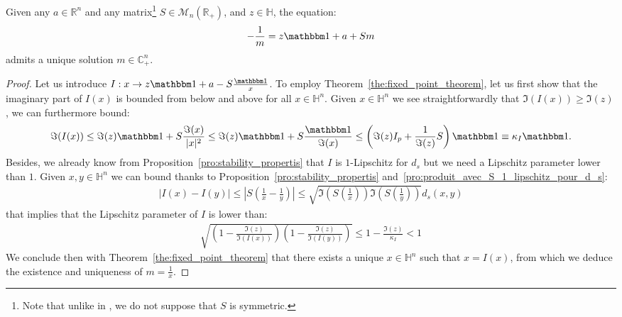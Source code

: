 \documentclass[a4papaer, titlepage]{book}
\begin{document}
\begin{proposition}\label{pro:resolution_equation_erdos}
  Given any $a \in \mathbb R^n$ and any matrix\footnote{Note that unlike in \cite{AJA16}, we do not suppose that $S$ is symmetric.} $S \in \mathcal M_{n}(\mathbb R_+)$, and $z \in \mathbb H$, the equation:
  \begin{align*}
    -\frac{1}{m} = z\un + a + Sm
  \end{align*}
  admits a unique solution $m \in \mathbb C_ +^n$.
\end{proposition}
\begin{proof}
  Let us introduce $I : x \to z\un + a - S \frac{\un}{x}$. To employ Theorem~\ref{the:fixed_point_theorem}, let us first show that the imaginary part of $I(x)$ is bounded from below and above for all $x \in \mathbb H^n$. Given $x \in \mathbb H^n$ we see straightforwardly that $\Im(I(x)) \geq \Im(z)$, we can furthermore bound:
  \begin{align*}
    \Im(I(x)) \leq \Im(z) \un + S \frac{\Im(x)}{|x|^2} \leq \Im(z) \un + S \frac{\un}{\Im(x)}  \leq \left(\Im(z)I_p + \frac{1}{\Im(z)}S\right)\un\equiv \kappa_I \un.
  \end{align*}
  Besides, we already know from Proposition~\ref{pro:stability_propertis} that $I$ is $1$-Lipschitz for $d_s$ but we need a Lipschitz parameter lower than $1$.
  Given $x,y \in \mathbb H^n$ we can bound thanks to Proposition~\ref{pro:stability_propertis} and~\ref{pro:produit_avec_S_1_lipschitz_pour_d_s}:
  \begin{align*}
     \left\vert I(x) - I(y)\right\vert
     \leq \left\vert S \left(\frac{1}{x}- \frac{1}{y}\right)\right\vert
     \leq  \sqrt{\Im \left( S \left(\frac{1}{x}\right)\right)\Im \left(S \left(\frac{1}{y}\right)\right)} d_s(x,y) 
   \end{align*} 
   that implies that the Lipschitz parameter of $I$ is lower than:
   \begin{align*}
     \sqrt{\left(1- \frac{\Im(z)}{\Im(I(x))}\right)\left(1- \frac{\Im(z)}{\Im(I(y))}\right)}\leq 1 - \frac{\Im(z)}{\kappa_I} <1
   \end{align*}
   We conclude then with Theorem~\ref{the:fixed_point_theorem} that there exists a unique $x\in \mathbb H^n$ such that $x = I(x)$, from which we deduce the existence and uniqueness of $m = \frac{1}{x}$.
\end{proof}
\end{document}
